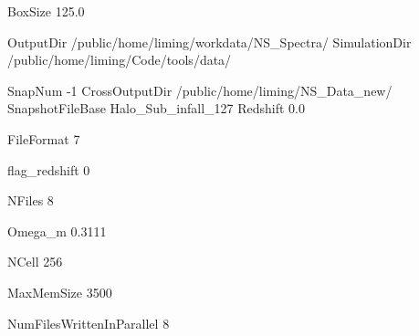 BoxSize 125.0

OutputDir     /public/home/liming/workdata/NS_Spectra/
SimulationDir /public/home/liming/Code/tools/data/

SnapNum -1
CrossOutputDir /public/home/liming/NS_Data_new/
SnapshotFileBase Halo_Sub_infall_127
Redshift 0.0

FileFormat 7

flag_redshift 0 

NFiles  8 %

Omega_m 0.3111

NCell   256 %

MaxMemSize  3500 

NumFilesWrittenInParallel 8


